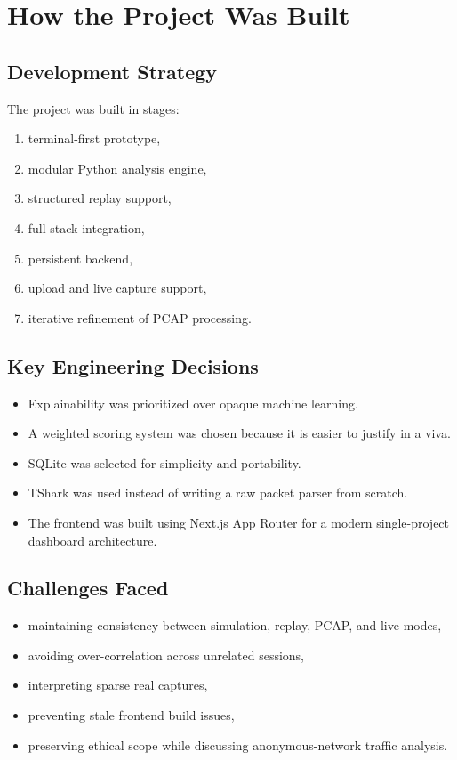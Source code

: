 \documentclass[12pt,a4paper]{report}
\begin{document}
\chapter{How the Project Was Built}
\section{Development Strategy}
The project was built in stages:
\begin{enumerate}[leftmargin=1.5em]
    \item terminal-first prototype,
    \item modular Python analysis engine,
    \item structured replay support,
    \item full-stack integration,
    \item persistent backend,
    \item upload and live capture support,
    \item iterative refinement of PCAP processing.
\end{enumerate}

\section{Key Engineering Decisions}
\begin{itemize}[leftmargin=1.5em]
    \item Explainability was prioritized over opaque machine learning.
    \item A weighted scoring system was chosen because it is easier to justify in a viva.
    \item SQLite was selected for simplicity and portability.
    \item TShark was used instead of writing a raw packet parser from scratch.
    \item The frontend was built using Next.js App Router for a modern single-project dashboard architecture.
\end{itemize}

\section{Challenges Faced}
\begin{itemize}[leftmargin=1.5em]
    \item maintaining consistency between simulation, replay, PCAP, and live modes,
    \item avoiding over-correlation across unrelated sessions,
    \item interpreting sparse real captures,
    \item preventing stale frontend build issues,
    \item preserving ethical scope while discussing anonymous-network traffic analysis.
\end{itemize}
\end{document}
